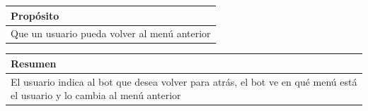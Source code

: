 \begin{table}[!ht]

\begin{tabular}{|m{10cm}|}
\hline\rowcolor{Gray}
{\bf Propósito}\\
\hline
{Que un usuario pueda volver al menú anterior} \\
\hline

\end{tabular}


\end{table}

\begin{table}[!ht]

\begin{tabular}{|m{10cm}|}
\hline\rowcolor{Gray}
{\bf Resumen}\\
\hline
{El usuario indica al bot que desea volver para atrás, el bot ve en qué menú está el usuario y lo cambia al menú anterior} \\
\hline

\end{tabular}



\end{table}

